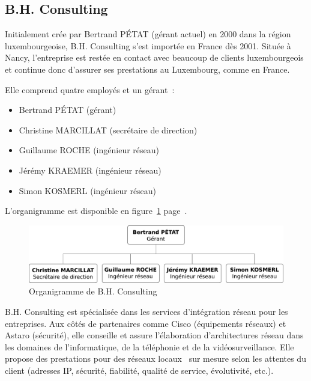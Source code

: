 \subsection{B.H. Consulting}

Initialement crée par Bertrand PÉTAT (gérant actuel) en 2000 dans la région luxembourgeoise, B.H. Consulting s'est importée en France dès 2001. Située à Nancy, l'entreprise est restée en contact avec beaucoup de clients luxembourgeois et continue donc d'assurer ses prestations au Luxembourg, comme en France.

Elle comprend quatre employés et un gérant~:

\begin{itemize}
\item Bertrand PÉTAT (gérant)
\item Christine MARCILLAT (secrétaire de direction)
\item Guillaume ROCHE (ingénieur réseau)
\item Jérémy KRAEMER (ingénieur réseau)
\item Simon KOSMERL (ingénieur réseau)
\end{itemize}

L'organigramme est disponible en figure~\ref{organigramme} page~\pageref{organigramme}.

\begin{figure}[!h]
	\begin{center}
		\includegraphics[width=\textwidth]{img/organigramme.pdf}
	\end{center}
	\caption{Organigramme de B.H. Consulting}
	\label{organigramme}
\end{figure}

B.H. Consulting est spécialisée dans les services d'intégration réseau pour les entreprises. Aux côtés de partenaires comme Cisco (équipements réseaux) et Astaro (sécurité), elle conseille et assure l'élaboration d'architectures réseau dans les domaines de l'informatique, de la téléphonie et de la vidéosurveillance. Elle propose des prestations pour des réseaux locaux \og~sur mesure\fg{} selon les attentes du client (adresses IP, sécurité, fiabilité, qualité de service, évolutivité, etc.).

